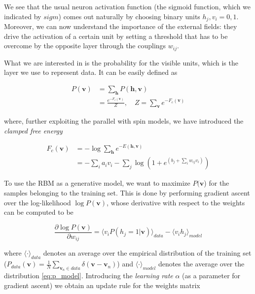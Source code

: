 \documentclass[notitlepage]{revtex4-1}
\begin{document}
We see that the usual neuron activation function (the sigmoid function, which we indicated by \(sigm\)) comes out naturally by choosing binary units \(h_j,v_i = 0,1\). Moreover, we can now understand the importance of the external fields: they drive the activation of a certain unit by setting a threshold that has to be overcome by the opposite layer through the couplings \(w_{ij}\).

What we are interested in is the probability for the visible units, which is the layer we use to represent data. It can be easily defined as

\begin{align}
P(\textbf{v}) &  = \sum_{\textbf{h}} P(\textbf{h},\textbf{v}) \nonumber \\
& = \frac{e^{-F_c(\textbf{v})}}{Z}, \quad Z = \sum_{\textbf{v}} e^{-F_c(\textbf{v})}
\label{eq:p_model}
\end{align}

where, further exploiting the parallel with spin models, we have introduced the \textit{clamped free energy}

\begin{align}
F_c(\textbf{v}) & = -\log \sum_{\textbf{h}} e^{-E(\textbf{h},\textbf{v})} \nonumber \\
& = -\sum_i a_i v_i -\sum_j \log \left( 1 +  e^{\left( b_j + \sum_i w_{ij} v_i \right)} \right)
\end{align}

To use the RBM as a generative model, we want to maximize \(P(\textbf{v}\)) for the samples belonging to the training set. This is done by performing gradient ascent over the log-likelihood \(\log P(\textbf{v})\), whose derivative with respect to the weights can be computed to be

\begin{equation}
\frac{\partial \log P(\textbf{v})}{\partial w_{ij}} = \langle v_i P(h_j = 1 | \mathbf{v}) \rangle_{data} - \langle v_i h_j \rangle_{model}
\label{eq:opt}
\end{equation}

where \(\langle \cdot \rangle_{data}\) denotes an average over the empirical distribution of the training set (\( \textstyle P_{data}(\mathbf{v}) = \frac{1}{N} \sum_{\mathbf{v}_n \in data} \delta (\mathbf{v} - \mathbf{v}_n ) \)) and 
\(\langle \cdot \rangle_{model}\) denotes the average over the distribution \eqref{eq:p_model}. Introducing the \textit{learning rate} \(\alpha \) (as a parameter for gradient ascent) we obtain an update rule for the weights matrix
\end{document}
